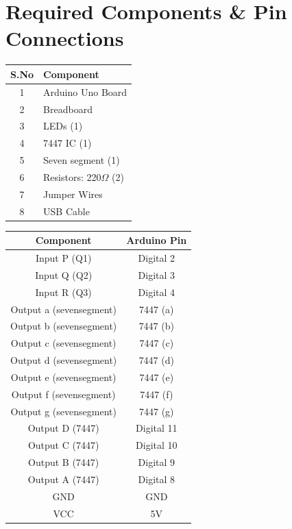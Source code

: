 \documentclass[a4paper,12pt]{article}
\begin{document}
\section*{Required Components \& Pin Connections}
\begin{center}
\begin{minipage}{0.45\textwidth}
\begin{table}[H]
\centering
\begin{tabular}{|c|l|}
\hline
\textbf{S.No} & \textbf{Component} \\ \hline
1 & Arduino Uno Board \\
2 & Breadboard \\
3 & LEDs (1) \\
4 & 7447 IC (1)\\
5 & Seven segment (1) \\
6 & Resistors: 220$\Omega$ (2) \\
7 & Jumper Wires \\
8 & USB Cable \\
\hline
\end{tabular}
\end{table}
\end{minipage}
\hspace{0.05\textwidth}
\begin{minipage}{0.45\textwidth}
\begin{table}[H]
\centering
\begin{tabular}{|c|c|}
\hline
\textbf{Component} & \textbf{Arduino Pin} \\ \hline
Input P (Q1) & Digital 2 \\
Input Q (Q2) & Digital 3 \\
Input R (Q3) & Digital 4 \\
Output a (sevensegment) & 7447 (a) \\
Output b (sevensegment) & 7447 (b) \\
Output c (sevensegment) & 7447 (c) \\
Output d (sevensegment) & 7447 (d) \\
Output e (sevensegment) & 7447 (e) \\
Output f (sevensegment) & 7447 (f) \\
Output g (sevensegment) & 7447 (g) \\
Output D (7447) & Digital 11\\
Output C (7447) & Digital 10 \\
Output B (7447) & Digital 9\\
Output A (7447) & Digital 8 \\
GND & GND \\
VCC & 5V \\
\hline
\end{tabular}
\end{table}
\end{minipage}
\end{center}
\newpage
\end{document}
